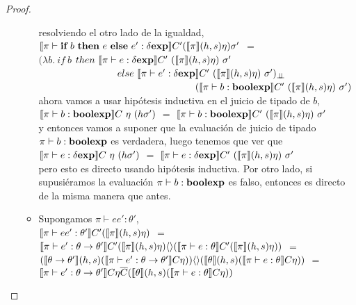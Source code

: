 \begin{proof}
\begin{itemize}
\begin{itemize}
resolviendo el otro lado de la igualdad,\\

$\llbracket \pi \vdash \textbf{if} \ b \ \textbf{then} \ e \ \textbf{else} \ e' : \delta \textbf{exp} \rrbracket C'
							(\llbracket \pi \rrbracket(h,s)\eta)\sigma'$ $=$\\
$(\lambda b . \ if \ b $ $then \ \semBrcks{ \pi \vdash e : \deltaexp}C' \ 
						(\semBrcks{\pi}(h,s)\eta) \ \sigma'$\\
\indent \ \ \ \ \ \ \ \ \ \ \ \ \ \ \ \ 
$else \ \semBrcks{ \pi \vdash e' : \deltaexp}C' \ 
						(\semBrcks{\pi}(h,s)\eta) \ \sigma')_{\dbot}$ \\
\indent \ \ \ \ \ \ \ \ \ \ \ \ \ \ \ \ \ \ \ \ \ \ \ \ \ \ \ \ \ \ \ \
$(\semBrcks{ \pi \vdash b : \boolexp}C' \ (\semBrcks{\pi}(h,s)\eta) \ \sigma')$\\

ahora vamos a usar hip\'otesis inductiva en el juicio de tipado de $b$,\\

$\semBrcks{ \pi \vdash b : \boolexp}C \ \eta \ (h\sigma')$ $=$
$\semBrcks{ \pi \vdash b : \boolexp}C' \ (\semBrcks{\pi}(h,s)\eta) \ \sigma'$\\

y entonces vamos a suponer que la evaluaci\'on de juicio de tipado
$\pi \vdash b : \textbf{boolexp}$ es verdadera, luego tenemos que ver que\\

$\llbracket  \pi \vdash e : \delta \textbf{exp} \rrbracket C \ \eta \ (h\sigma')$ $=$ 
$\semBrcks{ \pi \vdash e : \deltaexp}C' \ (\semBrcks{\pi}(h,s)\eta) \ \sigma'$\\

pero esto es directo usando hip\'otesis inductiva. Por otro lado, si supusi\'eramos
la evaluaci\'on $\pi \vdash b : \textbf{boolexp}$ es falso, entonces es directo de la misma
manera que antes.

\item Supongamos $\pi \vdash ee' : \theta'$, \\

$\llbracket \pi \vdash ee' : \theta' \rrbracket C'(\llbracket \pi \rrbracket(h,s)\eta)$ $=$\\
$\llbracket \pi \vdash e' : \theta \rightarrow \theta' \rrbracket C'
		(\llbracket \pi \rrbracket(h,s)\eta)\langle  \rangle
		(\llbracket \pi \vdash e : \theta \rrbracket C'(\llbracket \pi \rrbracket(h,s)\eta))$ $=$\\
$(\llbracket \theta \rightarrow \theta' \rrbracket(h,s)
	(\llbracket \pi \vdash e' : \theta \rightarrow \theta' \rrbracket C \eta))\langle  \rangle
	(\llbracket \theta \rrbracket(h,s)(\llbracket \pi \vdash e : \theta \rrbracket C\eta))$ $=$\\
$\llbracket \pi \vdash e' : \theta \rightarrow \theta' \rrbracket C \eta \overline{C}
	(\llbracket \theta \rrbracket(h,s)(\llbracket \pi \vdash e : \theta \rrbracket C\eta))$\\


\end{itemize}
\end{itemize}
\end{proof}

